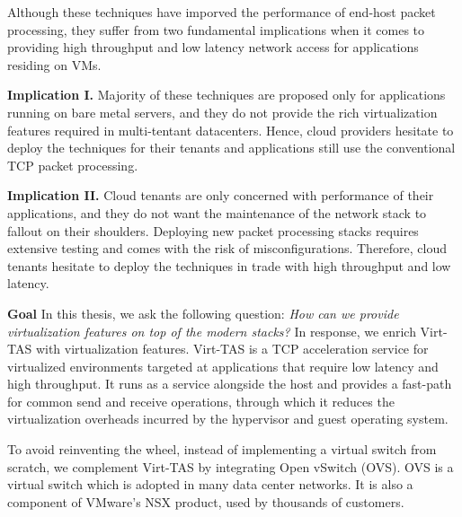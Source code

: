 Although these techniques have imporved the performance of end-host packet processing, they 
suffer from two fundamental implications when it comes to providing high throughput and 
low latency network access for applications residing on VMs.


\textbf{Implication I.} Majority of these techniques are proposed only for applications running
on bare metal servers, and they do not provide the rich virtualization features required in 
multi-tentant datacenters. Hence, cloud providers hesitate to deploy the techniques for
their tenants and applications still use the conventional TCP packet processing.

\textbf{Implication II.} Cloud tenants are only concerned with performance of their applications,
and they do not want the maintenance of the network stack to fallout on their shoulders. Deploying 
new packet processing stacks requires extensive testing and comes with the risk of 
misconfigurations. Therefore, cloud tenants hesitate to deploy the techniques in trade with
high throughput and low latency.

\textbf{Goal} In this thesis, we ask the following question: \emph{How can we provide virtualization 
features on top of the modern stacks?} In response, we enrich Virt-TAS with virtualization features.
Virt-TAS is a TCP acceleration service for virtualized environments targeted at applications 
that require low latency and high throughput. It runs as a service alongside the host and provides 
a fast-path for common send and receive operations, through which it reduces the virtualization 
overheads incurred by the hypervisor and guest operating system. 

To avoid reinventing the wheel, instead of implementing a virtual switch from scratch, we
complement Virt-TAS by integrating Open vSwitch (OVS). OVS is a virtual switch which is adopted
in many data center networks. It is also a component of VMware's NSX product, used by thousands
of customers.

